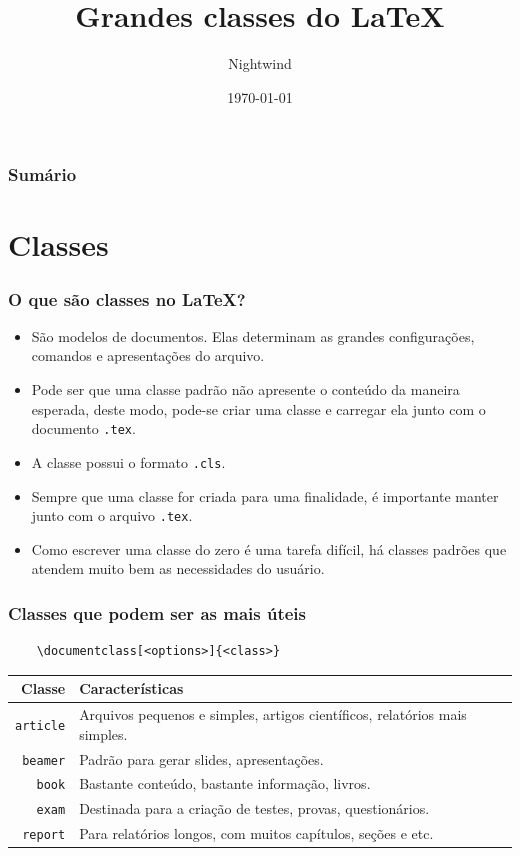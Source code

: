 \documentclass{beamer}
\title{Grandes classes do \LaTeX}
\author{Nightwind}
\institute[CTISM]{Colégio Técnico Industrial de Santa Maria}
\date{\today}
\begin{document}
\frame{\titlepage}

\begin{frame}
    \frametitle{Sumário}
    \tableofcontents
\end{frame}

\section{Classes}

\begin{frame}[fragile]
    \frametitle{O que são classes no \LaTeX?}

    \begin{itemize}
        \item São modelos de documentos. Elas determinam as grandes configurações, comandos e apresentações do arquivo.
        \item Pode ser que uma classe padrão não apresente o conteúdo da maneira esperada, deste modo, pode-se criar uma classe e carregar ela junto com o documento \lstinline[]!.tex!.
        \item A classe possui o formato \lstinline[]!.cls!.
        \item Sempre que uma classe for criada para uma finalidade, é importante manter junto com o arquivo \lstinline[]!.tex!.
        \item Como escrever uma classe do zero é uma tarefa difícil, há classes padrões que atendem muito bem as necessidades do usuário. 
    \end{itemize}

\end{frame}

\begin{frame}[fragile]
    \frametitle{Classes que podem ser as mais úteis}
\begin{lstlisting}
    \documentclass[<options>]{<class>}
\end{lstlisting}
\begin{tabularx}{\textwidth}{rX}
    \hline
    \textbf{Classe} & \textbf{Características} \\ \hline
    \lstinline[]!article! & Arquivos pequenos e simples, artigos científicos, relatórios mais simples. \\ \hline
    \lstinline[]!beamer! & Padrão para gerar slides, apresentações. \\ \hline
    \lstinline[]!book! & Bastante conteúdo, bastante informação, livros. \\ \hline
    \lstinline[]!exam! & Destinada para a criação de testes, provas, questionários. \\ \hline
    \lstinline[]!report! & Para relatórios longos, com muitos capítulos, seções e etc. \\ \hline
\end{tabularx}
\end{frame}
\end{document}
